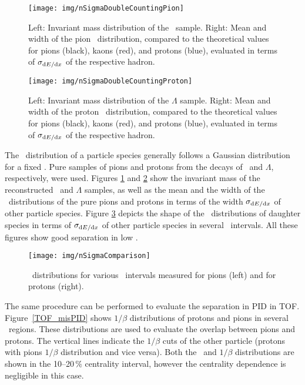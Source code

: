 \begin{figure}[!htb]
\centering
\texttt{[image: img/nSigmaDoubleCountingPion]}
\caption[Invariant mass distribution of the \Kshort\ sample. Mean and width of the pion \dedx\ distribution.]{\label{nSigmaDoublePion} Left: Invariant mass distribution of the \Kshort\ sample. Right: Mean and width of the pion \dedx\ distribution, compared to the theoretical values for pions (black), kaons (red), and protons (blue), evaluated in terms of $\sigma_{\mathrm{d} E / \mathrm{d} x}$ of the respective hadron.}
\end{figure}


\begin{figure}[!htb]
\centering
\texttt{[image: img/nSigmaDoubleCountingProton]}
\caption[Invariant mass distribution of the $\Lambda$ sample. Mean and width of the proton \dedx\ distribution.]{\label{nSigmaDoubleProton} Left: Invariant mass distribution of the $\Lambda$ sample. Right: Mean and width of the proton \dedx\ distribution, compared to the theoretical values for pions (black), kaons (red), and protons (blue), evaluated in terms of $\sigma_{\mathrm{d} E / \mathrm{d} x}$ of the respective hadron.}
\end{figure}

The \dedx\ distribution of a particle species generally follows a Gaussian distribution for a fixed \pt\@. Pure samples of pions and protons from the decays of \Kshort\ and $\Lambda$, respectively, were used. Figures \ref{nSigmaDoublePion} and \ref{nSigmaDoubleProton} show the invariant mass of the reconstructed \Kshort\ and  $\Lambda$ samples, as well as the mean and the width of the \dedx\ distributions of the pure pions and protons in terms of the width $\sigma_{\mathrm{d} E / \mathrm{d} x}$ of other particle species. Figure \ref{nSigmaComparison} depicts the shape of the \dedx\ distributions of daughter species in terms of $\sigma_{\mathrm{d} E / \mathrm{d} x}$ of other particle species in several \pt\ intervals. All these figures show good separation in low \pt\@.

\begin{figure}[!htb]
\centering
\texttt{[image: img/nSigmaComparison]}
\caption[\dedx\ distributions for pions and for protons.]{\label{nSigmaComparison} \dedx\ distributions for various \pt\ intervals measured for pions (left) and for protons (right).}
\end{figure}

The same procedure can be performed to evaluate the separation in PID in TOF\@. Figure~\ref{TOF_misPID} shows $1/\beta$ distributions of protons and pions in several \pt\ regions. These distributions are used to evaluate the overlap between pions and protons. The vertical lines indicate the $1/\beta$ cuts of the other particle (protons with pions $1/\beta$ distribution and vice versa)\@. Both the \dedx\ and $1/\beta$ distributions are shown in the 10--20$\,\%$ centrality interval, however the centrality dependence is negligible in this case. 

